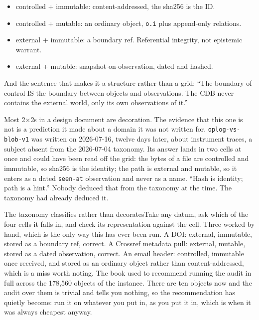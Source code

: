 \begin{itemize}
\item controlled + immutable: content-addressed, the sha256 is the ID.
\item controlled + mutable: an ordinary object, \texttt{o.i} plus append-only relations.
\item external + immutable: a boundary ref. Referential integrity, not epistemic warrant.
\item external + mutable: snapshot-on-observation, dated and hashed.
\end{itemize}

And the sentence that makes it a structure rather than a grid: ``The boundary of control IS the boundary between objects and observations. The CDB never contains the external world, only its own observations of it.''

Most 2$\times$2s in a design document are decoration. The evidence that this one is not is a prediction it made about a domain it was not written for. \texttt{oplog-vs-blob-v1} was written on 2026-07-16, twelve days later, about instrument traces, a subject absent from the 2026-07-04 taxonomy. Its answer lands in two cells at once and could have been read off the grid: the bytes of a \labFileFormat{} file are controlled and immutable, so sha256 is the identity; the path is external and mutable, so it enters as a dated \texttt{seen-at} observation and never as a name. ``Hash is identity; path is a hint.'' Nobody deduced that from the taxonomy at the time. The taxonomy had already deduced it.

\begin{Correspondence}{The taxonomy classifies rather than decorates}{Take any datum, ask which of the four cells it falls in, and check its representation against the cell.}
Three worked by hand, which is the only way this has ever been run. A DOI: external, immutable, stored as a boundary ref, correct. A Crossref metadata pull: external, mutable, stored as a dated observation, correct. An email header: controlled, immutable once received, and stored as an ordinary object rather than content-addressed, which is a miss worth noting. The book used to recommend running the audit in full across the 178,560 objects of the \labLineageName{} instance. There are ten objects now and the audit over them is trivial and tells you nothing, so the recommendation has quietly become: run it on whatever you put in, as you put it in, which is when it was always cheapest anyway.
\end{Correspondence}

